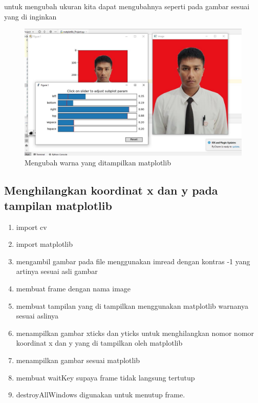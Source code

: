 \newpage
untuk mengubah ukuran kita dapat mengubahnya seperti pada gambar sesuai yang di inginkan
\begin{figure}[ht]
\centering
\includegraphics[scale=0.5]{figures/2,47,1.jpg}
\caption{Mengubah warna yang ditampilkan matplotlib}
\label{contoh}
\end{figure}





\newpage
\subsection{Menghilangkan koordinat x dan y pada tampilan matplotlib}

\begin{enumerate}
	\item import cv
	\item import matplotlib
	\item mengambil gambar pada file menggunakan imread dengan kontras -1 yang artinya sesuai asli gambar
	\item membuat frame dengan nama image
	\item membuat tampilan yang di tampilkan menggunakan matplotlib warnanya sesuai aslinya
	\item menampilkan gambar
	\gunakan xticks dan yticks untuk menghilangkan nomor nomor koordinat x dan y yang di tampilkan oleh matplotlib
	\item menampilkan gambar sesuai matplotlib
	\item membuat waitKey supaya frame tidak langsung tertutup
	\item destroyAllWindows digunakan untuk menutup frame.
\end{enumerate}

